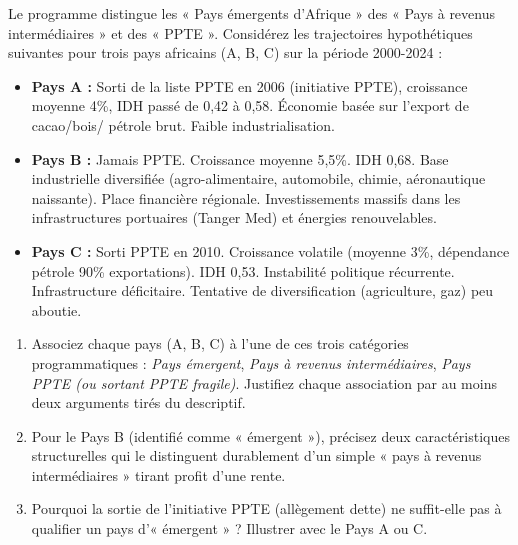\documentclass[11pt]{article}
\begin{document}
\begin{exercice}
Le programme distingue les « Pays émergents d'Afrique » des « Pays à revenus intermédiaires » et des « PPTE ». Considérez les trajectoires hypothétiques suivantes pour trois pays africains (A, B, C) sur la période 2000-2024 :

\begin{itemize}
    \item \textbf{Pays A :} Sorti de la liste PPTE en 2006 (initiative PPTE), croissance moyenne 4\%, IDH passé de 0,42 à 0,58. Économie basée sur l'export de cacao/bois/ pétrole brut. Faible industrialisation.
    \item \textbf{Pays B :} Jamais PPTE. Croissance moyenne 5,5\%. IDH 0,68. Base industrielle diversifiée (agro-alimentaire, automobile, chimie, aéronautique naissante). Place financière régionale. Investissements massifs dans les infrastructures portuaires (Tanger Med) et énergies renouvelables.
    \item \textbf{Pays C :} Sorti PPTE en 2010. Croissance volatile (moyenne 3\%, dépendance pétrole 90\% exportations). IDH 0,53. Instabilité politique récurrente. Infrastructure déficitaire. Tentative de diversification (agriculture, gaz) peu aboutie.
\end{itemize}

\begin{enumerate}
    \item Associez chaque pays (A, B, C) à l'une de ces trois catégories programmatiques : \textit{Pays émergent}, \textit{Pays à revenus intermédiaires}, \textit{Pays PPTE (ou sortant PPTE fragile)}. Justifiez chaque association par au moins deux arguments tirés du descriptif.
    \item Pour le Pays B (identifié comme « émergent »), précisez deux caractéristiques structurelles qui le distinguent durablement d'un simple « pays à revenus intermédiaires » tirant profit d'une rente.
    \item Pourquoi la sortie de l'initiative PPTE (allègement dette) ne suffit-elle pas à qualifier un pays d'« émergent » ? Illustrer avec le Pays A ou C.
\end{enumerate}
\end{exercice}
\end{document}
